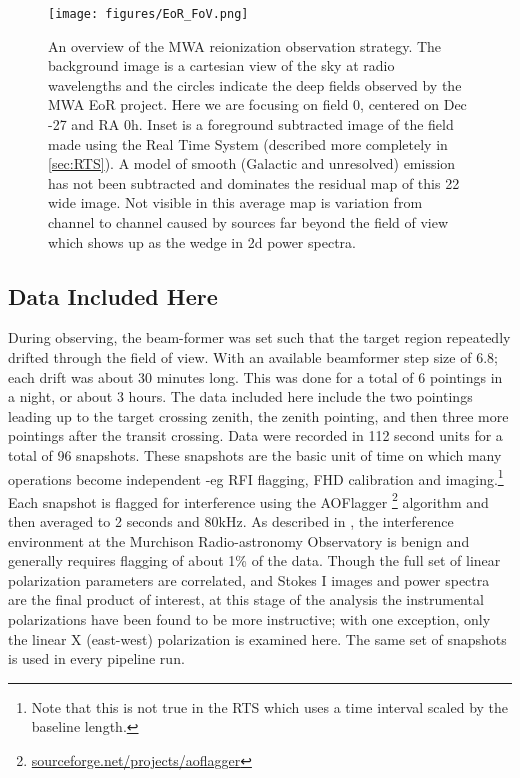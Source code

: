 \documentclass[twolcolumn,iop]{emulateapj}
\begin{document}
\begin{figure}[htbp]
\begin{center}
\texttt{[image: figures/EoR\_FoV.png]}
\caption{An overview of the MWA reionization observation strategy. The background image is a cartesian view of the sky at radio wavelengths and the circles indicate the deep fields observed by the MWA EoR project.  Here we are focusing on field 0, centered on Dec -27\arcdeg{} and RA 0h. Inset is a foreground subtracted image of the field made using the Real Time System (described more completely in \ref{sec:RTS}). A model of smooth (Galactic and unresolved) emission has not been subtracted and dominates the residual map of this 22\arcdeg{} wide image. Not visible in this average map is variation from channel to channel caused by sources far beyond the field of view which shows up as the wedge in 2d power spectra.}
\label{fig:fields}
\end{center}
\end{figure}

\subsection{Data Included Here}
During observing, the beam-former was set such that the target region repeatedly drifted through the field of view.  With an available beamformer step size of 6.8\arcdeg; each drift was about 30 minutes long.  This was done for a total of 6 pointings in a night, or about 3 hours. The data included here include the two pointings leading up to the target crossing zenith, the zenith pointing, and then three more pointings after the transit crossing.  Data were recorded in 112 second units for a total of 96 snapshots. These snapshots are the basic unit of time on which many operations become independent -eg RFI flagging, FHD calibration and imaging.\footnote{Note that this is not true in the RTS which uses a time interval scaled by the baseline length.}   Each snapshot is flagged for interference using the AOFlagger \citep{offringa:2010rfim.workE..36O}\footnote{ \url{sourceforge.net/projects/aoflagger} } algorithm and then averaged to 2 seconds and 80kHz.  As described in \cite{2015PASA...32....8O}, the interference environment at the Murchison Radio-astronomy Observatory is benign and generally requires flagging of about 1\% of the data.   Though the full set of linear polarization parameters are correlated, and Stokes I images and power spectra are the final product of interest, at this stage of the analysis the instrumental polarizations have been found to be more instructive; with one exception, only the linear X (east-west) polarization is examined here.   The same set of snapshots is used in every pipeline run.
\end{document}

